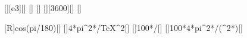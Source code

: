[\kilo\meter][e3][\m]
[\degree]
[\mpss]
[\hour][3600][\s]
[\s]

[R\cos\varphi]{\rEX*cos(\brX*pi/180)}[\m]
[]{4*pi^2*\rzX/\TeX^2}[\mpss]
[]{100*\azX/\gZX}[\percent]
[]{100*4*pi^2*\rzX/(\TsX^2*\gZX)}[\percent]
